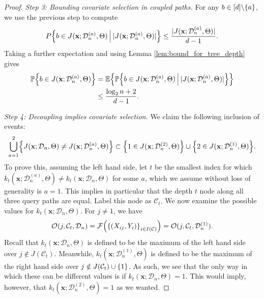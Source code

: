 \documentclass[11pt]{article}
\newcommand{\bx}{\mathbf{x}}
\DeclarePairedDelimiter{\braces}{\lbrace}{\rbrace}
\DeclarePairedDelimiter{\paren}{(}{)}
\DeclarePairedDelimiter{\abs}{|}{|}
\renewcommand{\P}{\mathbb{P}}
\newcommand{\E}{\mathbb{E}}
\newcommand{\cell}{\mathcal{C}}
\newcommand{\nfeats}{d}
\newcommand{\nsamples}{n}
\newcommand{\coordindices}{[\nfeats]}
\newcommand{\data}[1][n]{\mathcal{D}_{#1}}
\newcommand{\cellfeatindices}{J}
\begin{document}
\begin{proof}
    \textit{Step 3: Bounding covariate selection in coupled paths.}
    For any $b \in \coordindices\backslash\braces{a}$, we use the previous step to compute
    \begin{equation}
        P\braces*{b \in J(\bx;\data^{(a)},\Theta)~\vline~\abs{J(\bx;\data^{(a)},\Theta)}} \leq \frac{\abs{J(\bx;\data^{(a)},\Theta)}}{\nfeats - 1}.
    \end{equation}
    Taking a further expectation and using Lemma \ref{lem:bound_for_tree_depth} gives
    \begin{equation}
    \begin{split}
        \P\braces*{b \in J(\bx;\data^{(a)},\Theta)} & = \E\braces*{\P\braces*{b \in J(\bx;\data^{(a)},\Theta)~\vline~\abs{J(\bx;\data^{(a)},\Theta)}}} \\
        & \leq \frac{\log_2 \nsamples + 2}{\nfeats - 1}.
    \end{split}
    \end{equation}

    \textit{Step 4: Decoupling implies covariate selection.}
    We claim the following inclusion of events:
    \begin{equation}
    \label{eq:xor_decoupling_covariate_selection}
        \bigcup_{a=1}^2\braces*{J(\bx;\data,\Theta) \neq J(\bx;\data^{(a)},\Theta)} \subset \braces*{1 \in J(\bx;\data^{(2)},\Theta)}\cup \braces*{2 \in J(\bx;\data^{(1)},\Theta)}.
    \end{equation}
    To prove this, assuming the left hand side, let $t$ be the smallest index for which $k_t(\bx;\data^{(a)},\Theta) \neq k_t(\bx;\data,\Theta)$ for some $a$, which we assume without loss of generality is $a=1$.
    This implies in particular that the depth $t$ node along all three query paths are equal.
    Label this node as $\cell_t$.
    We now examine the possible values for $k_t(\bx;\data,\Theta)$.
    For $j \neq 1$, we have
    \begin{equation}
        \mathcal{O}(j,\cell_t,\data) = \mathcal{F}\paren*{\braces*{(X_{ij},Y_i)}_{i \in I(\cell)}} = \mathcal{O}(j,\cell_t,\data^{(1)}).
    \end{equation}
    Recall that $k_t(\bx;\data,\Theta)$ is defined to be the maximum of the left hand side over $j \notin \cellfeatindices(\cell_t)$.
    Meanwhile, $k_t(\bx;\data^{(1)},\Theta)$ is defined to be the maximum of the right hand side over $j \notin \cellfeatindices(\cell_t)\cup\braces{1}$.
    As such, we see that the only way in which these can be different values is if $k_t(\bx;\data,\Theta) = 1$.
    This would imply, however, that $k_t(\bx;\data^{(2)},\Theta) = 1$ as we wanted.


\end{proof}
\end{document}
